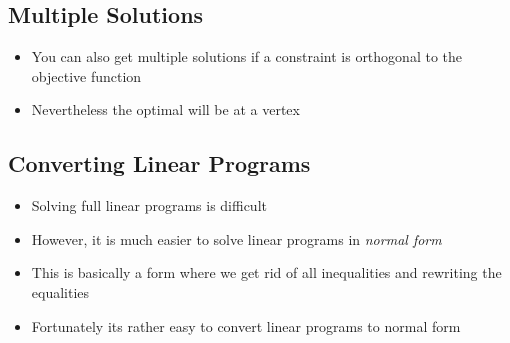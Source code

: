 
\begin{slide}
\section[-2]{Multiple Solutions}

\pb \pause
\begin{itemize}
\item You can also get multiple solutions if a constraint is orthogonal
  to the objective function\pauseh {}
  \begin{center}
    \pause
  \end{center}
\item Nevertheless the optimal will be at a vertex\pause
\end{itemize}
\end{slide}




\Outline %

\begin{slide}
\section{Converting Linear Programs}

\begin{PauseHighLight}
  \begin{itemize}
  \item Solving full linear programs is difficult\pause
  \item However, it is much easier to solve linear programs in
    \emph{normal form}\pause
  \item This is basically a form where we get rid of all
    inequalities and rewriting the equalities\pause
  \item Fortunately its rather easy to convert linear programs to normal
    form\pause
  \end{itemize}
\end{PauseHighLight}

\end{slide}



